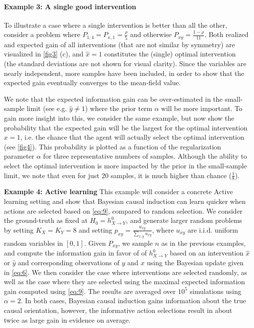 \documentclass[letterpaper]{article} %
\begin{document}
\paragraph{Example 3: A single good intervention}
To illustrate a case where a single intervention is better than all the other, consider a problem where $P_{1,4} = P_{x,1} = \frac{\rho}{5}$ and otherwise $P_{xy} = \frac{1-\rho}{11}$. Both realized and expected gain of all interventions (that are not similar by symmetry) are visualized in \cref{fig3} (c), and $\hat x = 1$ constitutes the (single) optimal intervention (the standard deviations are not shown for visual clarity). %
Since the variables are nearly independent, more samples have been included, in order to show that the expected  gain eventually converges to the mean-field value.


We note that the expected information gain can be over-estimated in the small-sample limit (see e.g. $\hat y \neq 1$) where the prior term $\alpha$ will be more important.
To gain more insight into this, we consider the same example, but now show the probability that the expected gain will be the largest for the optimal intervention $\hat x=1$, i.e. the chance that the agent will actually select the optimal intervention (see  \cref{fig4}). This probability is plotted as a function of the regularization parameter $\alpha$ for three representative numbers of samples. Although the ability to select the optimal intervention is more impacted by the prior in the small-sample limit, we note that even for just 20 samples, it is much higher than chance ($\frac{1}{8}$).

\textbf{Example 4: Active learning} This example will consider a concrete Active learning setting and show that Bayesian causal induction can learn quicker when actions are selected based on \cref{eq:9}, compared to random selection. We consider the ground-truth as fixed at $H_0 = h^0_{X \rightarrow Y}$, and generate larger random problems by setting $K_X = K_Y  =8$ and setting $p_{xy} = \frac{u_{xy}}{\sum_{x,y} u_{xy}}$, where $u_{xy}$ are i.i.d. uniform random variables in $[0,1]$. Given $P_{xy}$, we sample $n$ as in the previous examples, and compute the information gain in favor of of $h^0_{X\rightarrow Y}$ based on an intervention $\hat x$ or $\hat y$ and corresponding observations of $y$ and $x$ using the Bayesian update given in \cref{eq:6}. We then consider the case where interventions are selected randomly,
as well as the case where
they are selected using the maximal expected information gain computed using \cref{eq:9}. The results are averaged over $10^5$ simulations using $\alpha=2$. In both cases, Bayesian causal induction gains information about the true causal orientation, however, the informative action selections result in about twice as large gain in evidence on average.
\end{document}
